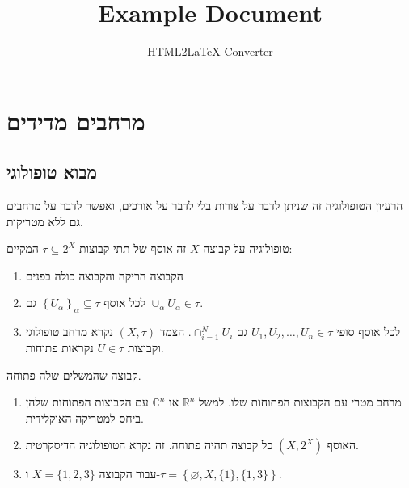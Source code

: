 \documentclass{tstextbook}
\begin{document}
\title{Example Document}
\author{HTML2LaTeX Converter}
\maketitle

\section{מרחבים מדידים}

\subsection{מבוא טופולוגי}

הרעיון הטופולוגיה זה שניתן לדבר על צורות בלי לדבר על אורכים, ואפשר לדבר על מרחבים גם ללא מטריקות.

\begin{definition}[טופולוגיה]
טופולוגיה על קבוצה \(X\) זה אוסף של תתי קבוצות \(\tau \subseteq 2^{X}\) המקיים:

  \begin{enumerate}
    \item הקבוצה הריקה והקבוצה כולה בפנים 


    \item לכל אוסף \(\left\{  U_{\alpha}  \right\}_{\alpha}\subseteq \tau\) גם \(\cup_{\alpha}U_{\alpha}\in \tau\). 


    \item לכל אוסף סופי \(U_{1},U_{2},\dots,U_{n}\in \tau\) גם \(\cap_{i=1}^{N}U_{i}\). 
הצמד \(\left( X,\tau \right)\) נקרא מרחב טופולוגי וקבוצות \(U \in \tau\) נקראות פתוחות.


  \end{enumerate}
\end{definition}
\begin{definition}
קבוצה שהמשלים שלה פתוחה.

\end{definition}
\begin{example}
  \begin{enumerate}
    \item מרחב מטרי עם הקבוצות הפתוחות שלו. למשל \(\mathbb{R}^{n}\) או \(\mathbb{C}^{n}\) עם הקבוצות הפתוחות שלהן ביחס למטריקה האוקלידית. 


    \item האוסף \((X,2^{X})\) כל קבוצה תהיה פתוחה. זה נקרא הטופולוגיה הדיסקרטית. 


    \item עבור הקבוצה \(X=\{ 1,2,3 \}\) ו-\(\tau=\left\{  \varnothing,X,\{ 1 \},\{ 1,3 \}  \right\}\). 


  \end{enumerate}
\end{example}
\end{document}
